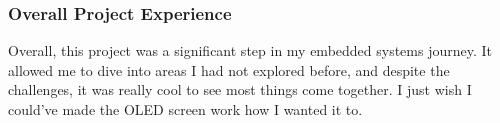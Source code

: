 \subsubsection{Overall Project Experience}
Overall, this project was a significant step in my embedded systems journey. It allowed me to dive into areas I had not explored before, and despite the challenges, it was really cool to see most things come together. I just wish I could've made the OLED screen work how I wanted it to.

\newpage
